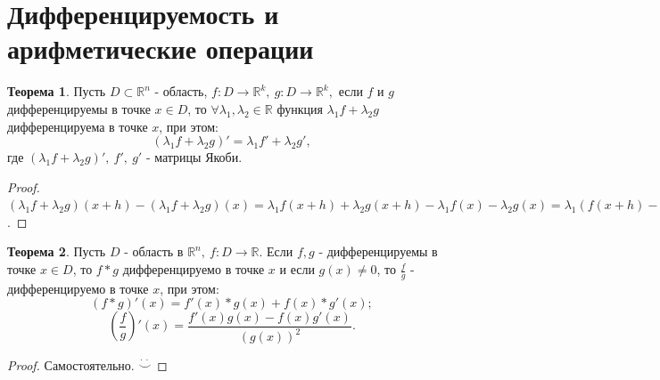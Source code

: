 \documentclass{report}
\theoremstyle{definition}
\newtheorem{theorem}{Теорема}[section]
\begin{document}
\section{Дифференцируемость и арифметические операции}

\begin{theorem}
  Пусть $D\subset \mathbb{R}^n$ - область, $f:D\rightarrow\mathbb{R}^k, \ g:D\rightarrow\mathbb{R}^k,$ если 
  $f$ и $g$ дифференцируемы в точке $x\in D$, то $\forall \lambda_1,\lambda_2\in\mathbb{R}$ функция
  $\lambda_1 f + \lambda_2 g$ дифференцируема в точке $x$, при этом:
  \begin{equation*}
    (\lambda_1f + \lambda_2g)' = \lambda_1f' + \lambda_2g',
  \end{equation*}
  где $(\lambda_1f + \lambda_2g)', \ f', \ g'$ - матрицы Якоби.
\end{theorem}

\begin{proof}
  $(\lambda_1f + \lambda_2g)(x + h) - (\lambda_1f + \lambda_2g)(x) = \lambda_1 f(x+h) + \lambda_2 g(x + h) -
  \lambda_1f(x) - \lambda_2g(x) = \lambda_1(f(x+h) - f(x)) + \lambda_2(g(x+h) - g(x)) = \lambda_1(f'(x)h +
  o(h)) + \lambda_2(g'(x)h + o(h)) = (\lambda_1 f'(x) + \lambda_2g'(x))h + o(h)$.
\end{proof}

\begin{theorem}
  Пусть $D$ - область в $\mathbb{R}^n, \ f:D\rightarrow\mathbb{R}$. Если $f,g$ - дифференцируемы в точке $x \in D$,
  то $f*g$ дифференцируемо в точке $x$ и если $g(x) \ne 0$, то $\frac{f}{g}$ - дифференцируемо в точке $x$, при
  этом:
  \begin{equation*}
    (f*g)'(x) = f'(x)*g(x) + f(x)*g'(x);
  \end{equation*}
  \begin{equation*}
    (\frac{f}{g})'(x) = \frac{f'(x)g(x) - f(x)g'(x)}{(g(x))^2}.
  \end{equation*}
\end{theorem}

\begin{proof}
  Самостоятельно. $\overset{\cdot \ \cdot}{\smile}$
\end{proof}
\end{document}
